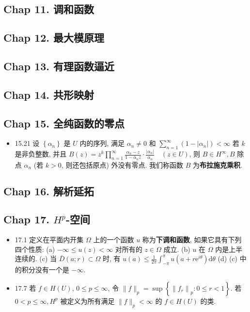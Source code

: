 \subsection{Chap 11. 调和函数}

\subsection{Chap 12. 最大模原理}

\subsection{Chap 13. 有理函数逼近}

\subsection{Chap 14. 共形映射}

\subsection{Chap 15. 全纯函数的零点}
\begin{itemize}
\item 15.21 设 $\left\{\alpha_{n}\right\}$ 是 $U$ 内的序列, 满足 $\alpha_{n} \neq 0$ 和 $\sum_{n=1}^{\infty}\left(1-\left|\alpha_{n}\right|\right)<\infty$ 若 $k$ 是非负整数, 并且
$B(z)=z^{k} \prod_{n=1}^{\infty} \frac{\alpha_{n}-z}{1-\bar{\alpha}_{n} z} \cdot \frac{\left|\alpha_{n}\right|}{\alpha_{n}} \quad(z \in U)$, 则 $B \in H^{\infty}, B$ 除点 $\alpha_{n}$ (若 $k>0$, 则还包括原点) 外没有零点. 我们称函数 $B$ 为\textbf{布拉施克乘积}.
\end{itemize}


\subsection{Chap 16. 解析延拓}

\subsection{Chap 17. $H^p$-空间}
\begin{itemize}
\item 17.1 定义在平面内开集 $\Omega$ 上的一个函数 $u$ 称为\textbf{下调和函数}, 如果它具有下列四个性质: (a) $-\infty \leqslant u(z)<\infty$ 对所有的 $z \in \Omega$ 成立. (b) $u$ 在 $\Omega$ 内是上半连续的. (c) 当 $\bar{D}(a ; r) \subset \Omega$ 时, 有 $u(a) \leqslant \frac{1}{2 \pi} \int_{-\pi}^{\pi} u\left(a+r \mathrm{e}^{i \theta}\right) \mathrm{d} \theta$ (d) (c) 中的积分没有一个是 $-\infty$.

\item 17.7 若 $f\in H(U)$, $0 \leqslant p \leqslant \infty$, 令 $\|f\|_{p}=\sup \left\{\left\|f_{r}\right\|_{p}: 0 \leqslant r<1\right\}$. 若 $0<p \leqslant \infty, H^{p}$ 被定义为所有满足 $\|f\|_{p}<\infty$ 的 $f \in H(U)$ 的类.
\end{itemize}


